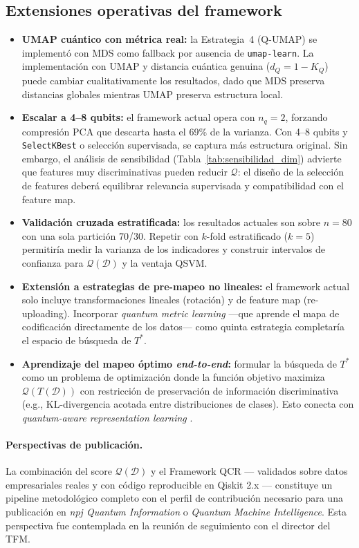 \subsection{Extensiones operativas del framework}

\begin{itemize}
    \item \textbf{UMAP cuántico con métrica real:} la Estrategia~4 (Q-UMAP) se implementó con MDS como fallback por ausencia de \texttt{umap-learn}. La implementación con UMAP y distancia cuántica genuina ($d_Q = 1 - K_Q$) puede cambiar cualitativamente los resultados, dado que MDS preserva distancias globales mientras UMAP preserva estructura local.
    \item \textbf{Escalar a 4--8 qubits:} el framework actual opera con $n_q = 2$, forzando compresión PCA que descarta hasta el 69\% de la varianza. Con 4--8 qubits y \texttt{SelectKBest} o selección supervisada, se captura más estructura original. Sin embargo, el análisis de sensibilidad (Tabla~\ref{tab:sensibilidad_dim}) advierte que features muy discriminativas pueden reducir $\mathcal{Q}$: el diseño de la selección de features deberá equilibrar relevancia supervisada y compatibilidad con el feature map.
    \item \textbf{Validación cruzada estratificada:} los resultados actuales son sobre $n=80$ con una sola partición 70/30. Repetir con $k$-fold estratificado ($k=5$) permitiría medir la varianza de los indicadores y construir intervalos de confianza para $\mathcal{Q}(\mathcal{D})$ y la ventaja QSVM.
    \item \textbf{Extensión a estrategias de pre-mapeo no lineales:} el framework actual solo incluye transformaciones lineales (rotación) y de feature map (re-uploading). Incorporar \textit{quantum metric learning} \citep{lloyd2020} ---que aprende el mapa de codificación directamente de los datos--- como quinta estrategia completaría el espacio de búsqueda de $T^*$.
    \item \textbf{Aprendizaje del mapeo óptimo \textit{end-to-end}:} formular la búsqueda de $T^*$ como un problema de optimización donde la función objetivo maximiza $\mathcal{Q}(T(\mathcal{D}))$ con restricción de preservación de información discriminativa (e.g., KL-divergencia acotada entre distribuciones de clases). Esto conecta con \textit{quantum-aware representation learning} \citep{huang2021}.
\end{itemize}

\paragraph{Perspectivas de publicación.}
La combinación del score $\mathcal{Q}(\mathcal{D})$ y el Framework QCR --- validados sobre datos empresariales reales y con código reproducible en Qiskit 2.x --- constituye un pipeline metodológico completo con el perfil de contribución necesario para una publicación en \textit{npj Quantum Information} o \textit{Quantum Machine Intelligence}. Esta perspectiva fue contemplada en la reunión de seguimiento con el director del TFM.

